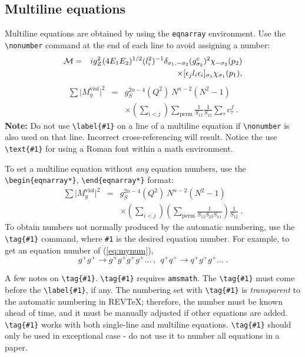 \documentclass[%
 aip,
 amsmath,amssymb,
 reprint,%
]{revtex4-2}
\begin{document}
\subsection{Multiline equations}

Multiline equations are obtained by using the \verb+eqnarray+
environment.  Use the \verb+\nonumber+ command at the end of each line
to avoid assigning a number:
\begin{eqnarray}
{\cal M}=&&ig_Z^2(4E_1E_2)^{1/2}(l_i^2)^{-1}
\delta_{\sigma_1,-\sigma_2}
(g_{\sigma_2}^e)^2\chi_{-\sigma_2}(p_2)\nonumber\\
&&\times
[\epsilon_jl_i\epsilon_i]_{\sigma_1}\chi_{\sigma_1}(p_1),
\end{eqnarray}
\begin{eqnarray}
\sum \vert M^{\text{viol}}_g \vert ^2&=&g^{2n-4}_S(Q^2)~N^{n-2}
        (N^2-1)\nonumber \\
 & &\times \left( \sum_{i<j}\right)
  \sum_{\text{perm}}
 \frac{1}{S_{12}}
 \frac{1}{S_{12}}
 \sum_\tau c^f_\tau~.
\end{eqnarray}
\textbf{Note:} Do not use \verb+\label{#1}+ on a line of a multiline
equation if \verb+\nonumber+ is also used on that line. Incorrect
cross-referencing will result. Notice the use \verb+\text{#1}+ for
using a Roman font within a math environment.

To set a multiline equation without \emph{any} equation
numbers, use the \verb+\begin{eqnarray*}+,
\verb+\end{eqnarray*}+ format:
\begin{eqnarray*}
\sum \vert M^{\text{viol}}_g \vert ^2&=&g^{2n-4}_S(Q^2)~N^{n-2}
        (N^2-1)\\
 & &\times \left( \sum_{i<j}\right)
 \left(
  \sum_{\text{perm}}\frac{1}{S_{12}S_{23}S_{n1}}
 \right)
 \frac{1}{S_{12}}~.
\end{eqnarray*}
To obtain numbers not normally produced by the automatic numbering,
use the \verb+\tag{#1}+ command, where \verb+#1+ is the desired
equation number. For example, to get an equation number of
(\ref{eq:mynum}),
\begin{equation}
g^+g^+ \rightarrow g^+g^+g^+g^+ \dots ~,~~q^+q^+\rightarrow
q^+g^+g^+ \dots ~. \tag{2.6$'$}\label{eq:mynum}
\end{equation}

A few notes on \verb=\tag{#1}=. \verb+\tag{#1}+ requires
\texttt{amsmath}. The \verb+\tag{#1}+ must come before the
\verb+\label{#1}+, if any. The numbering set with \verb+\tag{#1}+ is
\textit{transparent} to the automatic numbering in REV\TeX{};
therefore, the number must be known ahead of time, and it must be
manually adjusted if other equations are added. \verb+\tag{#1}+ works
with both single-line and multiline equations. \verb+\tag{#1}+ should
only be used in exceptional case - do not use it to number all
equations in a paper.
\end{document}
